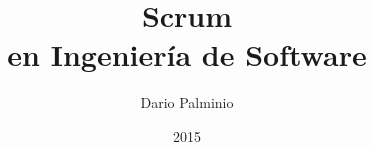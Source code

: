 
\title{\Huge 
    \textbf{Scrum}  \\ 
    \huge en Ingeniería de Software
    }

\author{Dario Palminio}

\date{2015} 

\maketitle

